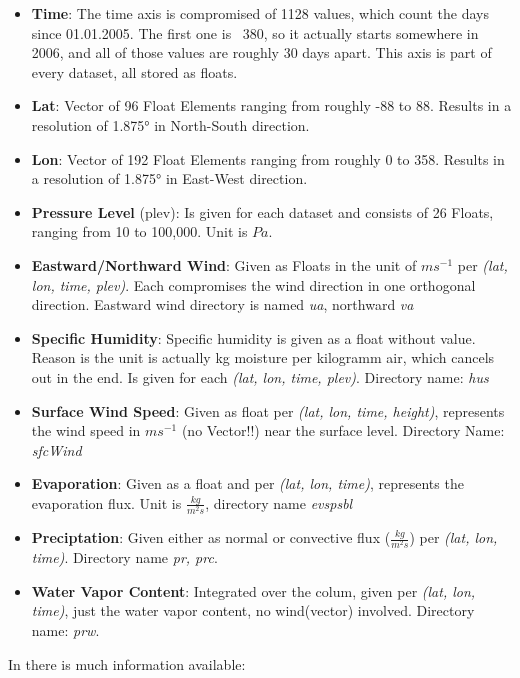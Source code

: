 \begin{itemize}
  \item \textbf{Time}: The time axis is  compromised of 1128 values, which count the days since 01.01.2005. The first one is ~380, so it actually starts somewhere in 2006, and all of those values are roughly 30 days apart. This axis is part of every dataset, all stored as floats.
  \item \textbf{Lat}: Vector of 96 Float Elements ranging from roughly -88 to 88. Results in a resolution of 1.875° in North-South direction.
  \item \textbf{Lon}: Vector of 192 Float Elements ranging from roughly 0 to 358. Results in a resolution of 1.875° in East-West direction. 
  \item \textbf{Pressure Level} (plev): Is given for each dataset and consists of 26 Floats, ranging from 10 to 100,000. Unit is $Pa$.
  \item \textbf{Eastward/Northward Wind}: Given as Floats in the unit of $ms^{-1}$ per \textit{(lat, lon, time, plev)}. Each compromises the wind direction in one orthogonal direction. Eastward wind directory is named \textit{ua}, northward \textit{va}  
  \item \textbf{Specific Humidity}: Specific humidity is given as a float without value. Reason is the unit is actually kg moisture per kilogramm air, which cancels out in the end. Is given for each \textit{(lat, lon, time, plev)}. Directory name: \textit{hus}
  \item \textbf{Surface Wind Speed}: Given as float per \textit{(lat, lon, time, height)}, represents the wind speed in $ms^{-1}$ (no Vector!!) near the surface level. Directory Name: \textit{sfcWind}
  \item \textbf{Evaporation}: Given as a float and per \textit{(lat, lon, time)}, represents the evaporation flux. Unit is $\frac{kg}{m^2s}$, directory name \textit{evspsbl}
  \item \textbf{Preciptation}: Given either as normal or convective flux ($\frac{kg}{m^2s}$) per \textit{(lat, lon, time)}. Directory name \textit{pr, prc}.
  \item \textbf{Water Vapor Content}: Integrated over the colum, given per \textit{(lat, lon, time)}, just the water vapor content, no wind(vector) involved. Directory name: \textit{prw}.
	
\end{itemize}



In \cite{maher_max_2019} there is much information available:




